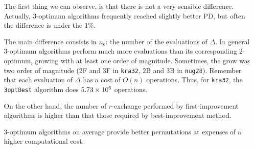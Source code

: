 The first thing we can observe, is that  there is not a very sensible difference. Actually, $3$-optimum algorithms frequently  reached slightly better PD, but often the difference is under the $1\%$.

The main difference consists in $n_\mathrm{e}$: the number of the evaluations of $\Delta$. In general $3$-optimum algorithms perform much more evaluations than its corresponding $2$-optimum, growing with at least one order of magnitude. Sometimes,  the grow was two order of magnitude ($2$F and $3$F in \texttt{kra32}, $2$B and $3$B in \texttt{nug28}). Remember that each evaluation of $\Delta$ has a cost of $O(n)$ operations. Thus, for \texttt{kra32}, the \texttt{3optBest} algorithm does $\num{5.73d6}$ operations.


On the other hand, the number of $r$-exchange performed by first-improvement algorithms is higher than that those required by best-improvement method.



	$3$-optimum algorithms on average provide better permutations at expenses of a higher computational cost.




